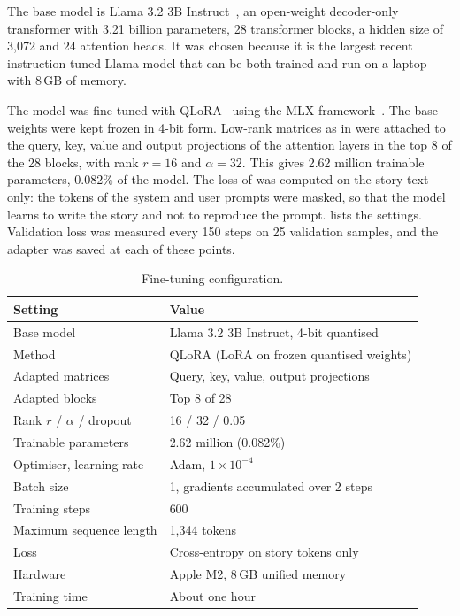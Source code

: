 The base model is Llama 3.2 3B Instruct~\cite{meta2024llama32}, an open-weight decoder-only transformer with 3.21 billion parameters, 28 transformer blocks, a hidden size of 3,072 and 24 attention heads. It was chosen because it is the largest recent instruction-tuned Llama model that can be both trained and run on a laptop with 8\,GB of memory.

The model was fine-tuned with QLoRA~\cite{dettmers2023qlora} using the MLX framework~\cite{hannun2023mlx}. The base weights were kept frozen in 4-bit form. Low-rank matrices as in  were attached to the query, key, value and output projections of the attention layers in the top 8 of the 28 blocks, with rank $r=16$ and $\alpha=32$. This gives 2.62 million trainable parameters, 0.082\% of the model. The loss of  was computed on the story text only: the tokens of the system and user prompts were masked, so that the model learns to write the story and not to reproduce the prompt.  lists the settings. Validation loss was measured every 150 steps on 25 validation samples, and the adapter was saved at each of these points.

\begin{table}[H]
\centering
\caption{Fine-tuning configuration.}
\label{tab:hyper}
\renewcommand{\arraystretch}{1.2}
\begin{tabular}{@{}ll@{}}
\toprule
\textbf{Setting} & \textbf{Value} \\
\midrule
Base model                  & Llama 3.2 3B Instruct, 4-bit quantised \\
Method                      & QLoRA (LoRA on frozen quantised weights) \\
Adapted matrices            & Query, key, value, output projections \\
Adapted blocks              & Top 8 of 28 \\
Rank $r$ / $\alpha$ / dropout & 16 / 32 / 0.05 \\
Trainable parameters        & 2.62 million (0.082\%) \\
Optimiser, learning rate    & Adam, $1\times10^{-4}$ \\
Batch size                  & 1, gradients accumulated over 2 steps \\
Training steps              & 600 \\
Maximum sequence length     & 1,344 tokens \\
Loss                        & Cross-entropy on story tokens only \\
Hardware                    & Apple M2, 8\,GB unified memory \\
Training time               & About one hour \\
\bottomrule
\end{tabular}
\end{table}

